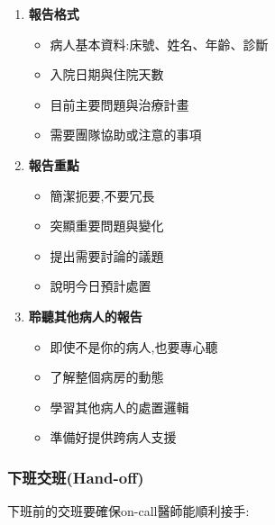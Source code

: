 \documentclass[12pt,a4paper]{article}
\begin{document}
\begin{enumerate}[leftmargin=*]
\item \textbf{報告格式}
\begin{itemize}
\item 病人基本資料:床號、姓名、年齡、診斷
\item 入院日期與住院天數
\item 目前主要問題與治療計畫
\item 需要團隊協助或注意的事項
\end{itemize}

\item \textbf{報告重點}
\begin{itemize}
\item 簡潔扼要,不要冗長
\item 突顯重要問題與變化
\item 提出需要討論的議題
\item 說明今日預計處置
\end{itemize}

\item \textbf{聆聽其他病人的報告}
\begin{itemize}
\item 即使不是你的病人,也要專心聽
\item 了解整個病房的動態
\item 學習其他病人的處置邏輯
\item 準備好提供跨病人支援
\end{itemize}
\end{enumerate}

\subsubsection{下班交班(Hand-off)}

下班前的交班要確保on-call醫師能順利接手:
\end{document}
